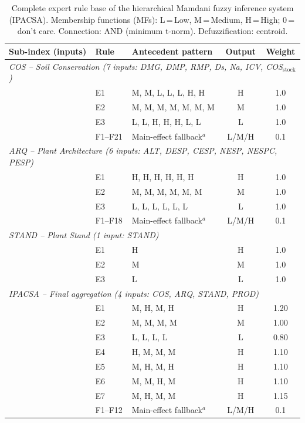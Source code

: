 \documentclass[12pt]{article}
\begin{document}
\clearpage
\begin{table}[ht]
\centering
\caption{Complete expert rule base of the hierarchical Mamdani fuzzy inference system (IPACSA). Membership functions (MFs): L\,=\,Low, M\,=\,Medium, H\,=\,High; 0\,=\,don't care. Connection: AND (minimum t-norm). Defuzzification: centroid.}\label{tab:s2_fuzzy}
\smallskip
\begin{tabular}{p{4.5cm}lp{5cm}cc}
\toprule
Sub-index (inputs) & Rule & Antecedent pattern & Output & Weight \\
\midrule
\multicolumn{5}{l}{\textit{COS -- Soil Conservation (7 inputs: DMG, DMP, RMP, Ds, Na, ICV, COS$_{\text{stock}}$)}} \\
 & E1 & M, M, L, L, L, H, H & H & 1.0 \\
 & E2 & M, M, M, M, M, M, M & M & 1.0 \\
 & E3 & L, L, H, H, H, L, L & L & 1.0 \\
 & F1--F21 & Main-effect fallback$^a$ & L/M/H & 0.1 \\
\midrule
\multicolumn{5}{l}{\textit{ARQ -- Plant Architecture (6 inputs: ALT, DESP, CESP, NESP, NESPC, PESP)}} \\
 & E1 & H, H, H, H, H, H & H & 1.0 \\
 & E2 & M, M, M, M, M, M & M & 1.0 \\
 & E3 & L, L, L, L, L, L & L & 1.0 \\
 & F1--F18 & Main-effect fallback$^a$ & L/M/H & 0.1 \\
\midrule
\multicolumn{5}{l}{\textit{STAND -- Plant Stand (1 input: STAND)}} \\
 & E1 & H & H & 1.0 \\
 & E2 & M & M & 1.0 \\
 & E3 & L & L & 1.0 \\
\midrule
\multicolumn{5}{l}{\textit{IPACSA -- Final aggregation (4 inputs: COS, ARQ, STAND, PROD)}} \\
 & E1 & M, H, M, H & H & 1.20 \\
 & E2 & M, M, M, M & M & 1.00 \\
 & E3 & L, L, L, L & L & 0.80 \\
 & E4 & H, M, M, M & H & 1.10 \\
 & E5 & M, H, M, H & H & 1.10 \\
 & E6 & M, M, H, M & H & 1.10 \\
 & E7 & M, H, M, M & H & 1.15 \\
 & F1--F12 & Main-effect fallback$^a$ & L/M/H & 0.1 \\
\bottomrule
\end{tabular}
\smallskip

\end{table}
\end{document}

